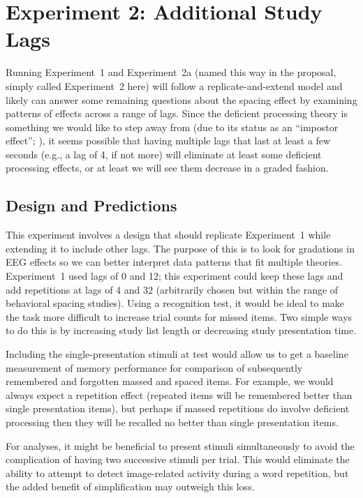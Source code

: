 
\section{Experiment 2: Additional Study Lags}

Running Experiment~1 and Experiment~2a (named this way in the proposal, simply called Experiment~2 here) will follow a replicate-and-extend model and likely can answer some remaining questions about the spacing effect by examining patterns of effects across a range of lags.  Since the deficient processing theory is something we would like to step away from (due to its status as an ``impostor effect''; ), it seems possible that having multiple lags that last at least a few seconds (e.g., a lag of 4, if not more) will eliminate at least some deficient processing effects, or at least we will see them decrease in a graded fashion.

\subsection{Design and Predictions}

This experiment involves a design that should replicate Experiment~1 while extending it to include other lags.  The purpose of this is to look for gradations in EEG effects so we can better interpret data patterns that fit multiple theories.  Experiment~1 used lags of 0 and 12; this experiment could keep these lags and add repetitions at lags of 4 and 32 (arbitrarily chosen but within the range of behavioral spacing studies).  Using a recognition test, it would be ideal to make the task more difficult to increase trial counts for missed items.  Two simple ways to do this is by increasing study list length or decreasing study presentation time.

Including the single-presentation stimuli at test would allow us to get a baseline measurement of memory performance for comparison of subsequently remembered and forgotten massed and spaced items.  For example, we would always expect a repetition effect (repeated items will be remembered better than single presentation items), but perhaps if massed repetitions do involve deficient processing then they will be recalled no better than single presentation items.

For analyses, it might be beneficial to present stimuli simultaneously to avoid the complication of having two successive stimuli per trial.  This would eliminate the ability to attempt to detect image-related activity during a word repetition, but the added benefit of simplification may outweigh this loss.

